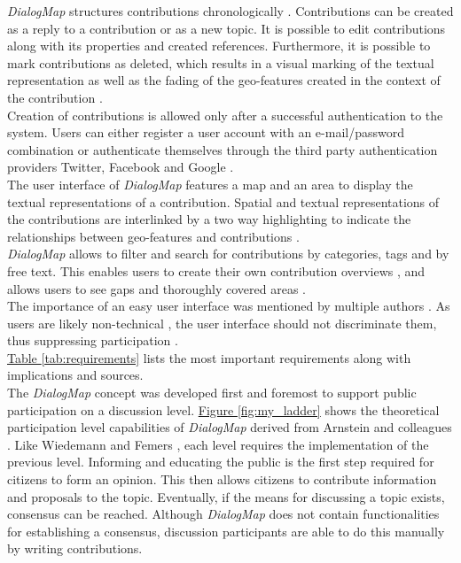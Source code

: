 \textit{DialogMap} structures contributions chronologically \cite{Cherubini2007_shared_maps,you2009_participatory_map_based}. Contributions can be created as a reply to a contribution or as a new topic. It is possible to edit contributions along with its properties and created references. Furthermore, it is possible to mark contributions as deleted, which results in a visual marking of the textual representation as well as the fading of the geo-features created in the context of the contribution \cite{Hopfer2007_Communication}.\\
Creation of contributions is allowed only after a successful authentication to the system. Users can either register a user account with an e-mail/password combination or authenticate themselves through the third party authentication providers Twitter, Facebook and Google \cite{Sani2011_Scalable_Argumap,chun2014usability}.\\
The user interface of \textit{DialogMap} features a map and an area to display the textual representations of a contribution. Spatial and textual representations of the contributions are interlinked by a two way highlighting to indicate the relationships between geo-features and contributions \cite{Cai2009_spatial_annotation_deliberation,Sidlar2009-AssessmentMapGeocollaborationTool}.\\
\textit{DialogMap} allows to filter and search for contributions by categories, tags and by free text. This enables users to create their own contribution overviews \cite{Voss2004_Evolution_PGIS,you2009_participatory_map_based}, and allows users to see gaps and thoroughly covered areas \cite{Hopfer2007_Communication}.\\
The importance of an easy user interface was mentioned by multiple authors \cite{Rinner2009_Web2_argumap,Jankowski2005_community_based_pgis,Tang2005_PPGIS_discussion_forum,zhao2006geodf,you2009_participatory_map_based}. As users are likely non-technical \cite{Cai2009_spatial_annotation_deliberation}, the user interface should not discriminate them, thus suppressing participation \cite{Carver2001_PPGIS_Cyberdemocracy}.\\
\hyperref[tab:requirements]{Table \ref{tab:requirements}} lists the most important requirements along with implications and sources.\\
The \textit{DialogMap} concept was developed first and foremost to support public participation on a discussion level. \hyperref[fig:my_ladder]{Figure \ref{fig:my_ladder}} shows the theoretical participation level capabilities of \textit{DialogMap} derived from Arnstein and colleagues \cite{Arnstein1969_citizen_participation,Wiedemann1993355,Connor1988_new_ladder}. Like Wiedemann and Femers \cite{Wiedemann1993355}, each level requires the implementation of the previous level. Informing and educating the public is the first step required for citizens to form an opinion. This then allows citizens to contribute information and proposals to the topic. Eventually, if the means for discussing a topic exists, consensus can be reached. Although \textit{DialogMap} does not contain functionalities for establishing a consensus, discussion participants are able to do this manually by writing contributions.\\
